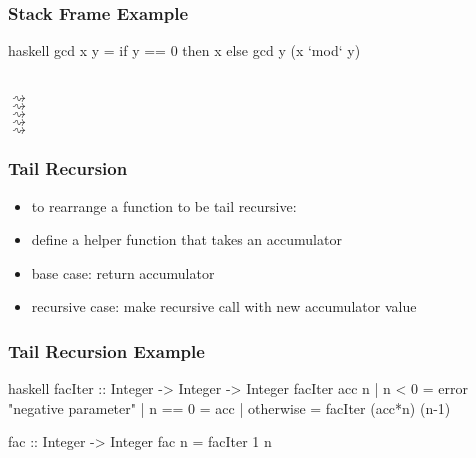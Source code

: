 \documentclass[dvipsnames]{beamer}
\theoremstyle{plain}
\begin{document}
\begin{frame}[fragile]
  \frametitle{Stack Frame Example}

  \begin{exampleblock}{}
    \begin{pygments}{haskell}
gcd x y = if y == 0 then x else gcd y (x `mod` y)
    \end{pygments}

    \\
    $\rightsquigarrow$ \\
    $\rightsquigarrow$ \\
    $\rightsquigarrow$ \\
    $\rightsquigarrow$ \\
    $\rightsquigarrow$ \\
  \end{exampleblock}
\end{frame}

\begin{frame}
  \frametitle{Tail Recursion}

  \begin{itemize}
    \item to rearrange a function to be tail recursive:

    \medskip
    \item define a helper function that takes an \alert{accumulator}
    \item base case: return accumulator
    \item recursive case: make recursive call with new accumulator value
  \end{itemize}
\end{frame}

\begin{frame}[fragile]
  \frametitle{Tail Recursion Example}

  \begin{exampleblock}{}
    \begin{pygments}{haskell}
facIter :: Integer -> Integer -> Integer
facIter acc n
  | n < 0     = error "negative parameter"
  | n == 0    = acc
  | otherwise = facIter (acc*n) (n-1)

fac :: Integer -> Integer
fac n = facIter 1 n
    \end{pygments}
  \end{exampleblock}
\end{frame}
\end{document}
